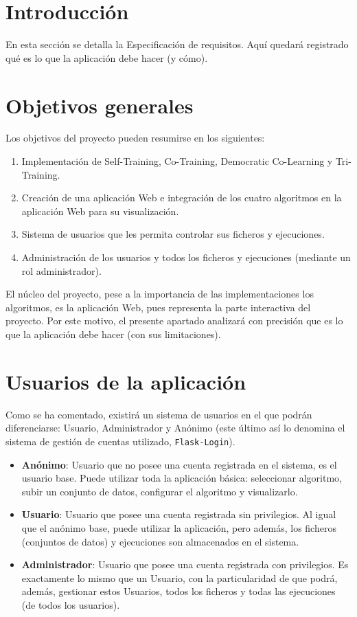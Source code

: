 
\section{Introducción}

En esta sección se detalla la Especificación de requisitos. Aquí quedará
registrado qué es lo que la aplicación debe hacer (y cómo).

\section{Objetivos generales}
Los objetivos del proyecto pueden resumirse en los siguientes:
\begin{enumerate}
    \item Implementación de Self-Training, Co-Training, Democratic Co-Learning y
    Tri-Training.
    \item Creación de una aplicación Web e integración de los cuatro algoritmos
    en la aplicación Web para su visualización.
    \item Sistema de usuarios que les permita controlar sus ficheros y
    ejecuciones.
    \item Administración de los usuarios y todos los ficheros y ejecuciones
    (mediante un rol administrador).
\end{enumerate}

El núcleo del proyecto, pese a la importancia de las implementaciones los
algoritmos, es la aplicación Web, pues representa la parte interactiva del
proyecto. Por este motivo, el presente apartado analizará con precisión que es
lo que la aplicación debe hacer (con sus limitaciones).

\section{Usuarios de la aplicación}

Como se ha comentado, existirá un sistema de usuarios en el que podrán
diferenciarse: Usuario, Administrador y Anónimo (este último así lo denomina el
sistema de gestión de cuentas utilizado, \texttt{Flask-Login}). 

\begin{itemize}
	\item \textbf{Anónimo}: Usuario que no posee una cuenta registrada en el sistema, es
	el usuario base. Puede utilizar toda la aplicación básica: seleccionar
	algoritmo, subir un conjunto de datos, configurar el algoritmo y
	visualizarlo.
	\item \textbf{Usuario}: Usuario que posee una cuenta registrada sin privilegios. Al
	igual que el anónimo base, puede utilizar la aplicación, pero además, los
	ficheros (conjuntos de datos) y ejecuciones son almacenados en el sistema.
	\item \textbf{Administrador}: Usuario que posee una cuenta registrada con
	privilegios. Es exactamente lo mismo que un Usuario, con la particularidad
	de que podrá, además, gestionar estos Usuarios, todos los ficheros y todas
	las ejecuciones (de todos los usuarios). 
\end{itemize}

